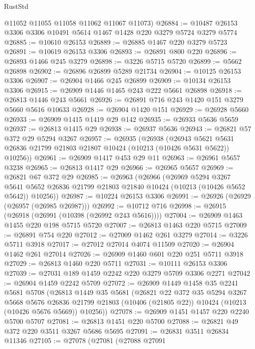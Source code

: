 \begin{lexlean}{RustStd}
\begin{coremodule}
{\begin{coremodule}
{{{{{{{{{{{{{{{{{{{{{{{{{{      @11052
      @11055
      @11058
      @11062
      @11067
      @11073)
@26884 := @10487 @26153 @3306 @3306 @10491 @5614 @1467 @1428 @220 @3279 @5724 @3279 @5774
@26885 := @10610 @26153
@26889 := @26885 @1467 @220 @3279 @5723
@26891 := @10619 @26153 @3306
@26893 := @26891 @800 @220
@26896 := @26893 @1466 @245 @3279
@26898 := @3226 @5715 @5720
@26899 := @5662 @26898
@26902 := @26896 @26899 @5289 @21734
@26904 := @10125 @26153 @3306
@26907 := @26904 @1466 @245 @26899
@26909 := @10134 @26153 @3306
@26915 := @26909 @1446 @1465 @243 @222 @5661 @26898
@26918 := @26813 @1446 @243 @5661
@26926 := @26891 @716 @243 @1420 @151 @3279 @5660 @5616 @10633
@26928 := @26904 @1420 @151
@26929 := @26928 @5660
@26933 := @26909 @1415 @1419 @29 @142
@26935 := @26933 @5636 @5659
@26937 := @26813 @1415 @29
@26938 := @26937 @5636
@26943 := @26821 @57 @372 @29 @5294 @3267
@26957 := @26935
    (@26938
      (@26943 @5621 @5631 @26836 @21799 @21803 @21807 @10424 (@10213 (@10426 @5631 @5622)) @10256))
@26961 := @26909 @1417 @453 @29 @11
@26963 := @26961 @5657 @3238
@26965 := @26813 @1417 @29
@26966 := @26965 @5657
@26969 := @26821 @67 @372 @29
@26985 := @26963
    (@26966
      (@26969
        @5294
        @3267
        @5641
        @5652
        @26836
        @21799
        @21803
        @21840
        @10424
        (@10213 (@10426 @5652 @5642))
        @10256))
@26987 := @10224 @26153 @3306
@26991 := @26926 (@26929 (@26957 (@26985 @26987)))
@26992 := @10712 @716
@26998 := @26915 (@26918 (@26991 (@10398 (@26992 @243 @5616))))
@27004 := @26909 @1463 @1455 @220 @198 @5715 @5720
@27007 := @26813 @1463 @220 @5715
@27009 := @26891 @754 @220
@27012 := @27009 @1462 @261 @3279
@27014 := @3226 @5711 @3918
@27017 := @27012 @27014 @4074 @11509
@27020 := @26904 @1462 @261 @27014
@27026 := @26909 @1460 @601 @220 @251 @5711 @3918
@27029 := @26813 @1460 @220 @5711
@27031 := @10111 @26153 @3306
@27039 := @27031 @189 @1459 @2242 @220 @3279 @5709 @3306 @2271
@27042 := @26904 @1459 @2242 @5709
@27072 := @26909
    @1449
    @1458
    @35
    @2241
    @5681
    @5708
    (@26813
      @1449
      @35
      @5681
      (@26821
        @22
        @372
        @35
        @5294
        @3267
        @5668
        @5676
        @26836
        @21799
        @21803
        (@10406 (@21805 @22))
        @10424
        (@10213 (@10426 @5676 @5669))
        @10256))
@27078 := @26909 @1451 @1457 @220 @2240 @5700 @5707
@27081 := @26813 @1451 @220 @5700
@27088 := @26821 @49 @372 @220 @3511 @3267 @5686 @5695
@27091 := @26831 @3511 @26834 @11346
@27105 := @27078
    (@27081
      (@27088
        @27091
}}}}}}}}}}}}}}}}}}}}}}}}}}
\end{coremodule}}
\end{coremodule}
\end{lexlean}
